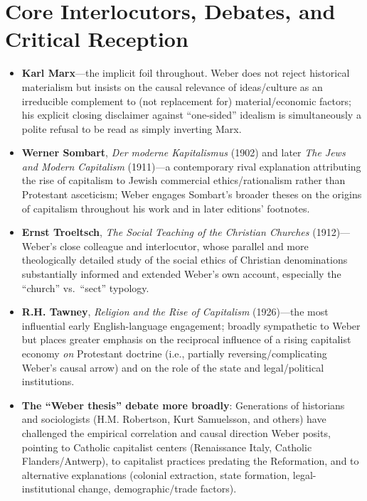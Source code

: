 \documentclass[12pt]{article}
\begin{document}
\section{Core Interlocutors, Debates, and Critical Reception}

\begin{itemize}[leftmargin=*, itemsep=4pt]
    \item \textbf{Karl Marx}---the implicit foil throughout. Weber does not reject historical materialism but insists on the causal relevance of ideas/culture as an irreducible complement to (not replacement for) material/economic factors; his explicit closing disclaimer against ``one-sided'' idealism is simultaneously a polite refusal to be read as simply inverting Marx.
    \item \textbf{Werner Sombart}, \textit{Der moderne Kapitalismus} (1902) and later \textit{The Jews and Modern Capitalism} (1911)---a contemporary rival explanation attributing the rise of capitalism to Jewish commercial ethics/rationalism rather than Protestant asceticism; Weber engages Sombart's broader theses on the origins of capitalism throughout his work and in later editions' footnotes.
    \item \textbf{Ernst Troeltsch}, \textit{The Social Teaching of the Christian Churches} (1912)---Weber's close colleague and interlocutor, whose parallel and more theologically detailed study of the social ethics of Christian denominations substantially informed and extended Weber's own account, especially the ``church'' vs.\ ``sect'' typology.
    \item \textbf{R.H. Tawney}, \textit{Religion and the Rise of Capitalism} (1926)---the most influential early English-language engagement; broadly sympathetic to Weber but places greater emphasis on the reciprocal influence of a rising capitalist economy \emph{on} Protestant doctrine (i.e., partially reversing/complicating Weber's causal arrow) and on the role of the state and legal/political institutions.
    \item \textbf{The ``Weber thesis'' debate more broadly}: Generations of historians and sociologists (H.M. Robertson, Kurt Samuelsson, and others) have challenged the empirical correlation and causal direction Weber posits, pointing to Catholic capitalist centers (Renaissance Italy, Catholic Flanders/Antwerp), to capitalist practices predating the Reformation, and to alternative explanations (colonial extraction, state formation, legal-institutional change, demographic/trade factors).

\end{itemize}
\end{document}
